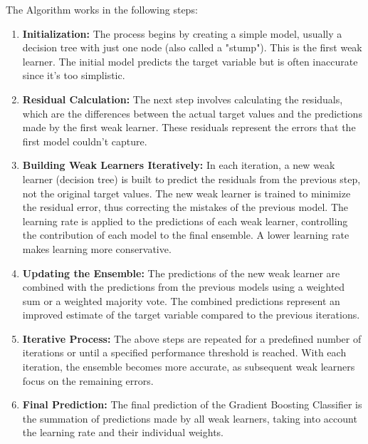 \documentclass{article}
\begin{document}
The Algorithm works in the following steps: 
\begin{enumerate}
\item \textbf{Initialization:} The process begins by creating a simple model, usually a decision tree with just one node (also called a "stump"). This is the first weak learner. The initial model predicts the target variable but is often inaccurate since it's too simplistic.
\item \textbf{Residual Calculation:} The next step involves calculating the residuals, which are the differences between the actual target values and the predictions made by the first weak learner. These residuals represent the errors that the first model couldn't capture.
\item \textbf{Building Weak Learners Iteratively:} In each iteration, a new weak learner (decision tree) is built to predict the residuals from the previous step, not the original target values. The new weak learner is trained to minimize the residual error, thus correcting the mistakes of the previous model. The learning rate is applied to the predictions of each weak learner, controlling the contribution of each model to the final ensemble. A lower learning rate makes learning more conservative.
\item \textbf{Updating the Ensemble:}
The predictions of the new weak learner are combined with the predictions from the previous models using a weighted sum or a weighted majority vote. The combined predictions represent an improved estimate of the target variable compared to the previous iterations.
\item \textbf{Iterative Process:}
The above steps are repeated for a predefined number of iterations or until a specified performance threshold is reached. With each iteration, the ensemble becomes more accurate, as subsequent weak learners focus on the remaining errors.
\item \textbf{Final Prediction:} The final prediction of the Gradient Boosting Classifier is the summation of predictions made by all weak learners, taking into account the learning rate and their individual weights.
\end{enumerate}
\end{document}
